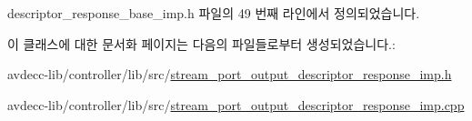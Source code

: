 descriptor\+\_\+response\+\_\+base\+\_\+imp.\+h 파일의 49 번째 라인에서 정의되었습니다.



이 클래스에 대한 문서화 페이지는 다음의 파일들로부터 생성되었습니다.\+:\begin{DoxyCompactItemize}
\item 
avdecc-\/lib/controller/lib/src/\hyperlink{stream__port__output__descriptor__response__imp_8h}{stream\+\_\+port\+\_\+output\+\_\+descriptor\+\_\+response\+\_\+imp.\+h}\item 
avdecc-\/lib/controller/lib/src/\hyperlink{stream__port__output__descriptor__response__imp_8cpp}{stream\+\_\+port\+\_\+output\+\_\+descriptor\+\_\+response\+\_\+imp.\+cpp}\end{DoxyCompactItemize}
